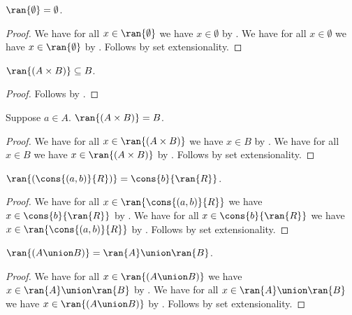 \begin{proposition}\label{ran_emptyset}
    $\ran{\emptyset} = \emptyset$.
\end{proposition}
\begin{proof}
    We have for all $x\in\ran{\emptyset}$ we have $x\in\emptyset$
        by .
    We have for all $x\in\emptyset$ we have $x\in\ran{\emptyset}$
        by .
    Follows by set extensionality.
\end{proof}

\begin{proposition}\label{ran_times}
    $\ran{(A\times B)}\subseteq B$.
\end{proposition}
\begin{proof}
    Follows by .
\end{proof}

\begin{proposition}\label{ran_times_inhabited}
    Suppose $a\in A$.
    $\ran{(A\times B)} = B$.
\end{proposition}
\begin{proof}
    We have for all $x\in\ran{(A\times B)}$ we have $x\in B$
        by .
    We have for all $x\in B$ we have $x\in\ran{(A\times B)}$
        by .
    Follows by set extensionality.
\end{proof}

\begin{proposition}\label{ran_cons}
    $\ran{(\cons{(a,b)}{R})} = \cons{b}{\ran{R}}$.
\end{proposition}
\begin{proof}
    We have for all $x\in\ran{\cons{(a,b)}{R}}$
        we have $x\in\cons{b}{\ran{R}}$
        by .
    We have for all $x\in\cons{b}{\ran{R}}$
        we have $x\in\ran{\cons{(a,b)}{R}}$
        by .
    Follows by set extensionality.
\end{proof}

\begin{proposition}\label{ran_union}
    $\ran{(A\union B)} = \ran{A}\union\ran{B}$.
\end{proposition}
\begin{proof}
    We have for all $x\in\ran{(A\union B)}$
        we have $x\in\ran{A}\union\ran{B}$
        by .
    We have for all $x\in\ran{A}\union\ran{B}$
        we have $x\in\ran{(A\union B)}$
        by .
    Follows by set extensionality.
\end{proof}

